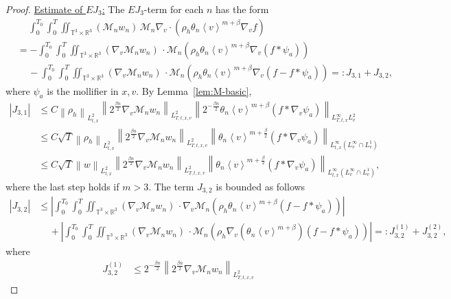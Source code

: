 \documentclass[11pt,american, reqno]{amsart}
\numberwithin{equation}{section}
\newcommand{\R}{\mathbb R}
\newcommand{\1}{\mathds{1}}
\newcommand{\Ni}{\noindent}
\newcommand{\CalM}{\mathcal{M}}
\newcommand{\vpran}[1]{\left(#1\right)}
\newcommand{\norm}[1]{\left\lVert#1\right\rVert}
\newcommand{\abs}[1]{\left\vert#1\right\vert}
\newcommand{\vint}[1]{\left\langle#1\right\rangle}
\newcommand{\T}{\mathbb{T}}
\numberwithin{equation}{section}
\begin{document}
\begin{proof}
\Ni \underline{Estimate of $EJ_3$:} The $EJ_3$-term for each $n$ has the form
\begin{align*}
& \quad \,
 \int_0^{T_0} \int_0^T \iint_{\T^3 \times \R^3}
   \vpran{\CalM_n w_n} \,
   \CalM_n \nabla_v \cdot \vpran{\rho_h \theta_n \vint{v}^{m+\beta} \nabla_v f}
\\
& = - \int_0^{T_0} \int_0^T \iint_{\T^3 \times \R^3}
   \vpran{\nabla_v \CalM_n w_n} \, \cdot
   \CalM_n \vpran{\rho_h \theta_n \vint{v}^{m+\beta} \nabla_v \vpran{f \ast \psi_a}}
\\
& \quad \,
  - \int_0^{T_0} \int_0^T \iint_{\T^3 \times \R^3}
   \vpran{\nabla_v \CalM_n w_n} \, \cdot
   \CalM_n \vpran{\rho_h \theta_n \vint{v}^{m+\beta} \nabla_v \vpran{f - f \ast \psi_a}}
= : J_{3,1} + J_{3,2},
\end{align*}
where $\psi_a$ is the mollifier in $x, v$. By Lemma~\ref{lem:M-basic}, 
\begin{align*}
 \abs{J_{3,1}}
&\leq
 C \norm{\rho_h}_{L^2_{t,x}}
 \norm{2^{\frac{\beta n}{2}}\nabla_v \CalM_n w_n}_{L^2_{T,t,x,v}}
 \norm{2^{-\frac{\beta n}{2}} \theta_n \vint{v}^{m+\beta} \vpran{f \ast \nabla_v\psi_a}}_{L^\infty_{T,t,x}L^2_v}
\\
& \leq
 C \sqrt{T}
 \norm{\rho_h}_{L^2_{t,x}}
 \norm{2^{\frac{\beta n}{2}}\nabla_v \CalM_n w_n}_{L^2_{T,t,x,v}}
 \norm{\theta_n \vint{v}^{m+\frac{\beta}{2}} \vpran{f \ast \nabla_v\psi_a}}_{L^\infty_{t,x}(L^\infty_v \cap L^1_v)}
\\
& \leq
 C \sqrt{T}
 \norm{w}_{L^2_{t,x}}
 \norm{2^{\frac{\beta n}{2}}\nabla_v \CalM_n w_n}_{L^2_{T,t,x,v}}
 \norm{\theta_n \vint{v}^{m+\frac{\beta}{2}} \vpran{f \ast \nabla_v\psi_a}}_{L^\infty_{t,x}(L^\infty_v \cap L^1_v)},
\end{align*}
where the last step holds if $m > 3$. 
The term $J_{3,2}$ is bounded as follows
\begin{align*}
 \abs{J_{3,2}}
& \leq
\abs{\int_0^{T_0} \int_0^T \iint_{\T^3 \times \R^3}
   \vpran{\nabla_v \CalM_n w_n} \, \cdot
   \nabla_v \CalM_n \vpran{\rho_h \theta_n \vint{v}^{m+\beta} \vpran{f - f \ast \psi_a}}}
\\
& \quad \,
 + \abs{\int_0^{T_0} \int_0^T \iint_{\T^3 \times \R^3}
   \vpran{\nabla_v \CalM_n w_n} \, \cdot
   \CalM_n \vpran{\rho_h \nabla_v \vpran{\theta_n \vint{v}^{m+\beta}} \vpran{f - f \ast \psi_a}}}
=: J^{(1)}_{3,2} + J^{(2)}_{3,2},
\end{align*}
where
\begin{align*}
 J^{(1)}_{3,2}
& \leq
 2^{-\frac{\beta n} {2}}
 \norm{2^{\frac{\beta n}{2}}\nabla_v \CalM_n w_n}_{L^2_{T,t,x,v}}

\end{align*}
\end{proof}
\end{document}
